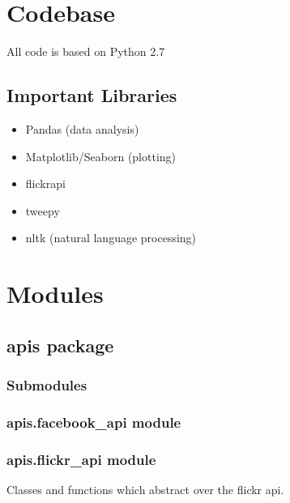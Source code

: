 \documentclass[letterpaper,10pt,english]{sphinxmanual}
\begin{document}
\chapter{Codebase}
\label{codebase:codebase}\label{codebase::doc}
All code is based on Python 2.7


\section{Important Libraries}
\label{codebase:important-libraries}\begin{itemize}
\item {} 
Pandas (data analysis)

\item {} 
Matplotlib/Seaborn (plotting)

\item {} 
flickrapi

\item {} 
tweepy

\item {} 
nltk (natural language processing)

\end{itemize}


\chapter{Modules}
\label{modules:modules}\label{modules::doc}

\section{apis package}
\label{apis:apis-package}\label{apis::doc}

\subsection{Submodules}
\label{apis:submodules}

\subsection{apis.facebook\_api module}
\label{apis:apis-facebook-api-module}\label{apis:module-apis.facebook_api}

\subsection{apis.flickr\_api module}
\label{apis:module-apis.flickr_api}\label{apis:apis-flickr-api-module}
Classes and functions which abstract over the flickr api.
\end{document}
